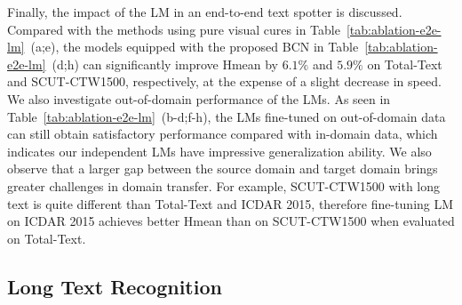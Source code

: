 \documentclass[10pt,journal,compsoc]{IEEEtran}
\begin{document}
Finally, the impact of the LM in an end-to-end text spotter is discussed. Compared with the methods using pure visual cures in Table~\ref{tab:ablation-e2e-lm}~(a;e), the models equipped with the proposed BCN in Table~\ref{tab:ablation-e2e-lm}~(d;h) can significantly improve Hmean by $6.1\%$ and $5.9\%$ on Total-Text and SCUT-CTW1500, respectively, at the expense of a slight decrease in speed. We also investigate out-of-domain performance of the LMs. As seen in Table~\ref{tab:ablation-e2e-lm}~(b-d;f-h), the LMs fine-tuned on out-of-domain data can still obtain satisfactory performance compared with in-domain data, which indicates our independent LMs have impressive generalization ability. We also observe that a larger gap between the source domain and target domain brings greater challenges in domain transfer. For example, SCUT-CTW1500 with long text is quite different than Total-Text and ICDAR 2015, therefore fine-tuning LM on ICDAR 2015 achieves better Hmean than on SCUT-CTW1500 when evaluated on Total-Text.


\subsection{Long Text Recognition}
\label{sec:exp_e2e_long_text}
\end{document}
